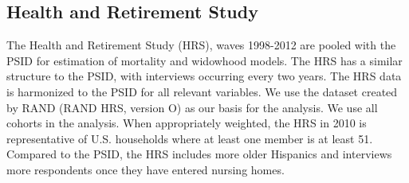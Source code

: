\subsection{Health and Retirement Study}
The Health and Retirement Study (HRS), waves 1998-2012 are pooled with the PSID for estimation of mortality and 
widowhood models. The HRS has a similar structure to the PSID, with interviews occurring every two years. The HRS data
is harmonized to the PSID for all relevant variables. We use the dataset created by RAND (RAND HRS, version O) as our basis 
for the analysis. We use all cohorts in the analysis. When appropriately weighted, the HRS in 2010 is representative of U.S. households 
where at least one member is at least 51.  Compared to the PSID, the HRS includes more older Hispanics and interviews more respondents 
once they have entered nursing homes.